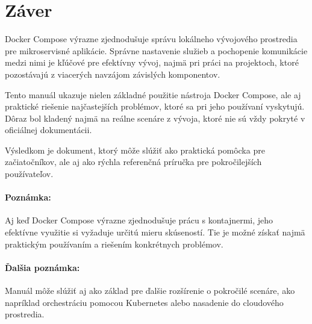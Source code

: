 \section*{Záver}

Docker Compose výrazne zjednodušuje správu lokálneho vývojového prostredia pre mikroservisné aplikácie. 
Správne nastavenie služieb a pochopenie komunikácie medzi nimi je kľúčové pre efektívny vývoj, 
najmä pri práci na projektoch, ktoré pozostávajú z viacerých navzájom závislých komponentov.

Tento manuál ukazuje nielen základné použitie nástroja Docker Compose, ale aj praktické riešenie najčastejších problémov, 
ktoré sa pri jeho používaní vyskytujú. Dôraz bol kladený najmä na reálne scenáre z vývoja, 
ktoré nie sú vždy pokryté v oficiálnej dokumentácii.

Výsledkom je dokument, ktorý môže slúžiť ako praktická pomôcka pre začiatočníkov, 
ale aj ako rýchla referenčná príručka pre pokročilejších používateľov.

\paragraph{Poznámka:}
Aj keď Docker Compose výrazne zjednodušuje prácu s kontajnermi, jeho efektívne využitie si vyžaduje určitú mieru skúseností. 
Tie je možné získať najmä praktickým používaním a riešením konkrétnych problémov.

\paragraph{Ďalšia poznámka:}
Manuál môže slúžiť aj ako základ pre ďalšie rozšírenie o pokročilé scenáre, 
ako napríklad orchestráciu pomocou Kubernetes alebo nasadenie do cloudového prostredia.


\clearpage
